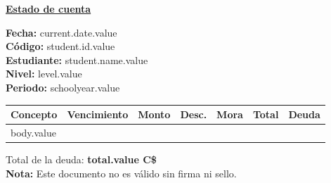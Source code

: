 \documentclass[12pt]{article}
\newcommand{\aDupleLeft}[2]{\textbf{#1}\hspace{2mm} #2 \hfill}
\newcommand{\aDupleRight}[2]{\hfill\textbf{#1}\hspace{2mm} #2}
\newcommand{\levelName}{level.value}
\newcommand{\studentId}{student.id.value}
\newcommand{\studentName}{student.name.value}
\newcommand{\schoolYear}{schoolyear.value}
\newcommand{\currentDate}{current.date.value}
\begin{document}
    \begin{center}
        \underline{\textbf{\Large Estado de cuenta}}
    \end{center}
    \hfill\textbf{Fecha: }\currentDate\\
    \aDupleLeft{Código:}{\studentId}\\
    \aDupleLeft{Estudiante:}{\studentName}\\
    \aDupleRight{Nivel:}{\levelName}\\

    \textbf{Periodo:} \schoolYear
    \begin{table}[H]
        \centering
        \begin{tabular}{ l | r | r | r | r | r || r }
            \hline
            Concepto & Vencimiento & Monto & Desc. & Mora & Total & Deuda \\\hline\hline
            body.value
        \end{tabular}
    \end{table}
    Total de la deuda: \textbf{total.value C\$}\\
    
    \vfill
    \textbf{Nota:} Este documento no es válido sin firma ni sello.
    
\end{document}

